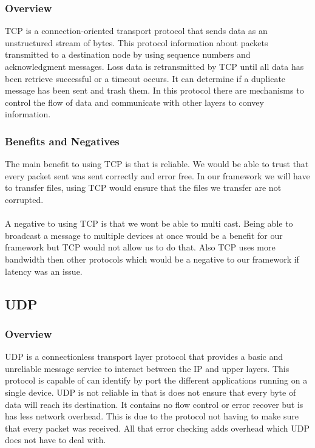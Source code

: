 \documentclass[draftclsnofoot, onecolumn, compsoc, 10pt]{IEEEtran}
\begin{document}
\subsubsection{Overview}
TCP is a connection-oriented transport protocol that sends data as an unstructured stream of bytes.\cite{Cisco} This protocol information about packets transmitted to a destination node by using sequence numbers and acknowledgment messages. Loss data is retransmitted by TCP until all data has been retrieve successful or a timeout occurs. It can determine if a duplicate message has been sent and trash them. In this protocol there are mechanisms to control the flow of data and communicate with other layers to convey information. \cite{Cisco}

\subsubsection{Benefits and Negatives}
The main benefit to using TCP is that is reliable. We would be able to trust that every packet sent was sent correctly and error free. In our framework we will have to transfer files, using TCP would ensure that the files we transfer are not corrupted. 
\\ \\
A negative to using TCP is that we wont be able to multi cast. Being able to broadcast a message to multiple devices at once would be a benefit for our framework but TCP would not allow us to do that. Also TCP uses more bandwidth then other protocols which would be a negative to our framework if latency was an issue.

\subsection{UDP}
\subsubsection{Overview}
UDP is a connectionless transport layer protocol that provides a basic and unreliable message service to interact between the IP and upper layers.\cite{kits} This protocol is capable of can identify by port the different applications running on a single device. UDP is not reliable in that is does not ensure that every byte of data will reach its destination. It contains no flow control or error recover but is has less network overhead. This is due to the protocol not having to make sure that every packet was received. All that error checking adds overhead which UDP does not have to deal with. \cite{kits}
\end{document}
